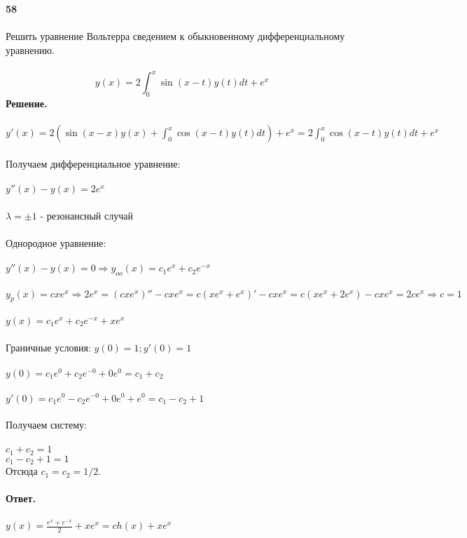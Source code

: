 \documentclass[10pt,a4paper]{article}
\begin{document}
	\noindent\textbf{58} \\ \\
	Решить уравнение Вольтерра сведением к обыкновенному дифференциальному уравнению.\\ \\
	$$y(x) = 2\int_{0}^{x}\sin(x-t)y(t)dt + e^x$$ 
	\textbf{Решение.} \\ \\
	$y'(x) = 2(\sin(x-x)y(x) + \int_{0}^{x}\cos(x-t)y(t)dt) + e^x = 2\int_{0}^{x}\cos(x-t)y(t)dt + e^x$ \\ \\
	Получаем дифференциальное уравнение: \\ \\
	$y''(x) - y(x) = 2e^x$ \\ \\
	$\lambda = \pm1$ - резонансный случай \\ \\
	Однородное уравнение: \\ \\
	$y''(x) - y(x) = 0 \Rightarrow y_{oo}(x) = c_1e^x + c_2e^{-x}$ \\ \\
	$y_p(x) = cxe^x \Rightarrow 2e^x = (cxe^x)'' - cxe^x = c(xe^x + e^x)' - cxe^x = c(xe^x + 2e^x) - cxe^x = 2ce^x \Rightarrow c = 1$ \\ \\
	$y(x) = c_1e^x + c_2e^{-x} + xe^x$ \\ \\
	Граничные условия: $y(0) = 1; y'(0) = 1$ \\ \\
	$y(0) = c_1e^0 + c_2e^{-0} + 0e^0 = c_1 + c_2$ \\ \\
	$y'(0) = c_1e^0 - c_2e^{-0} + 0e^0 + e^0 = c_1 - c_2 + 1$\\ \\
	Получаем систему: \\ \\
	$c_1 + c_2 = 1$ \\
	$c_1 - c_2 + 1 = 1$ \\
	Отсюда $c_1 = c_2 = 1/2$. \\ \\ 
	\textbf{Ответ.} \\ \\
	$y(x) = \frac{e^x + e^{-x}}{2} + xe^x = ch(x) + xe^x$ \\ \\
\end{document}
